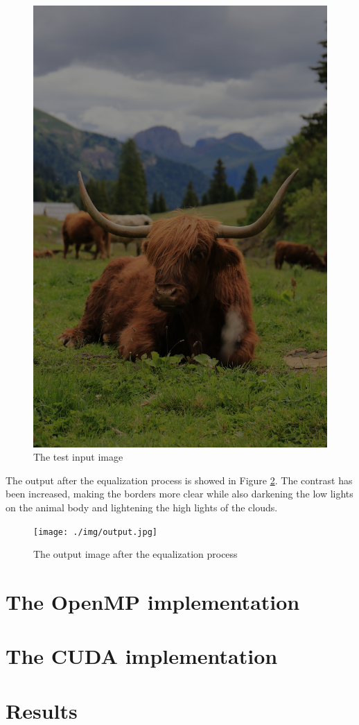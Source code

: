\documentclass[10pt,twocolumn,letterpaper]{article}
\begin{document}
\begin{figure}[!ht]
    \centering 
    \includegraphics[width=0.8\linewidth]{../assets/pic_low_contrast.jpg}
    \caption{The test input image}
    \label{fig:input}
\end{figure}

The output after the equalization process is showed in Figure \ref{fig:output}.
The contrast has been increased, making the borders more clear while also darkening
the low lights on the animal body and lightening the high lights of the clouds.

\begin{figure}[!ht]
    \centering 
    \texttt{[image: ./img/output.jpg]}
    \caption{The output image after the equalization process}
    \label{fig:output}
\end{figure}

\section{The OpenMP implementation}


\section{The CUDA implementation}


\section{Results}


\newpage

\nocite{*}
 

\end{document}

